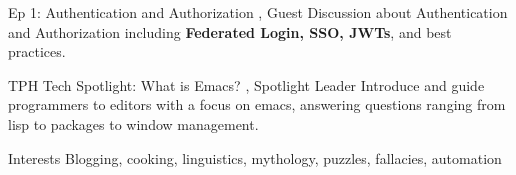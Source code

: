 

\begin{cventries}


  \cventrynoposition
    {Ep 1: Authentication and Authorization} %
    {, Guest}
    {}
    {Discussion about Authentication and Authorization including \textbf{Federated Login, SSO, JWTs}, and best practices.}

\cventrynoposition
    {TPH Tech Spotlight: What is Emacs?} %
    {, Spotlight Leader}
    {}
    {Introduce and guide programmers to editors with a focus on emacs, answering questions ranging from lisp to packages to window management.}

\cventrynoposition
    {Interests} %
    {}
    {}
    {Blogging, cooking, linguistics, mythology, puzzles, fallacies, automation}


\end{cventries}
